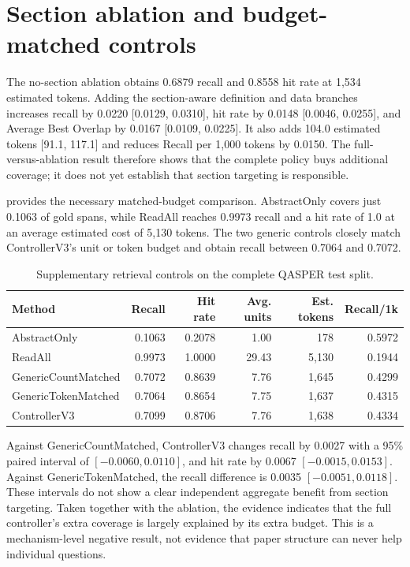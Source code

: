 \section{Section ablation and budget-matched controls}

The no-section ablation obtains 0.6879 recall and 0.8558 hit rate at 1,534 estimated tokens. Adding the section-aware definition and data branches increases recall by 0.0220 [0.0129, 0.0310], hit rate by 0.0148 [0.0046, 0.0255], and Average Best Overlap by 0.0167 [0.0109, 0.0225]. It also adds 104.0 estimated tokens [91.1, 117.1] and reduces Recall per 1,000 tokens by 0.0150. The full-versus-ablation result therefore shows that the complete policy buys additional coverage; it does not yet establish that section targeting is responsible.

 provides the necessary matched-budget comparison. AbstractOnly covers just 0.1063 of gold spans, while ReadAll reaches 0.9973 recall and a hit rate of 1.0 at an average estimated cost of 5,130 tokens. The two generic controls closely match ControllerV3's unit or token budget and obtain recall between 0.7064 and 0.7072.

\begin{table}[tb]
\centering
\caption{Supplementary retrieval controls on the complete QASPER test split.}
\label{tab:mechanism}
\small
\begin{tabular}{@{}lrrrrr@{}}
\toprule
Method & Recall & Hit rate & Avg. units & Est. tokens & Recall/1k \\
\midrule
AbstractOnly & 0.1063 & 0.2078 & 1.00 & 178 & 0.5972 \\
ReadAll & 0.9973 & 1.0000 & 29.43 & 5,130 & 0.1944 \\
GenericCountMatched & 0.7072 & 0.8639 & 7.76 & 1,645 & 0.4299 \\
GenericTokenMatched & 0.7064 & 0.8654 & 7.75 & 1,637 & 0.4315 \\
ControllerV3 & 0.7099 & 0.8706 & 7.76 & 1,638 & 0.4334 \\
\bottomrule
\end{tabular}
\end{table}

Against GenericCountMatched, ControllerV3 changes recall by 0.0027 with a 95\% paired interval of $[-0.0060,0.0110]$, and hit rate by 0.0067 $[-0.0015,0.0153]$. Against GenericTokenMatched, the recall difference is 0.0035 $[-0.0051,0.0118]$. These intervals do not show a clear independent aggregate benefit from section targeting. Taken together with the ablation, the evidence indicates that the full controller's extra coverage is largely explained by its extra budget. This is a mechanism-level negative result, not evidence that paper structure can never help individual questions.

